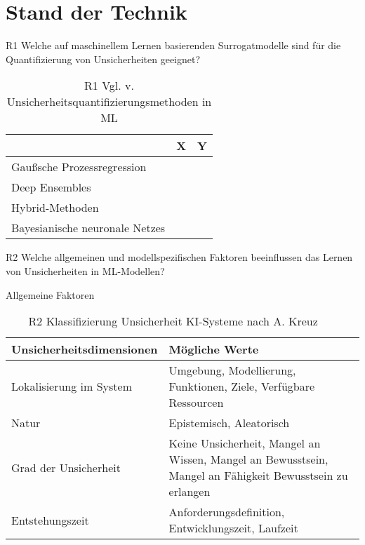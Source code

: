 
\chapter{Stand der Technik}
\label{chapter:stand-der-technik}


R1 Welche auf maschinellem Lernen basierenden Surrogatmodelle sind für die Quantifizierung von Unsicherheiten geeignet?

\begin{table}[htpb]
  \centering
  \begin{tabular}{|l|l|p{\dimexpr\textwidth-8cm-2\tabcolsep}|}  %
    \hline
    & \textbf{X} & \textbf{Y} \\
    \hline
    \gls{Gaußsche Prozessregression} & & \\
    \hline
    Deep Ensembles & & \\
    \hline
    Hybrid-Methoden & & \\
    \hline
    \gls{Bayesianische neuronale Netze}s & & \\
    \hline
  \end{tabular}
  \caption{R1 Vgl. v. Unsicherheitsquantifizierungsmethoden in ML}\label{tab:chapter6r1}
\end{table}


R2 Welche allgemeinen und modellspezifischen Faktoren beeinflussen das Lernen von Unsicherheiten in ML-Modellen?

Allgemeine Faktoren

\begin{table}[htpb]
  \begin{tabular}{|l|p{10cm}|}
    \hline
    \textbf{Unsicherheitsdimensionen} & \textbf{Mögliche Werte} \\
    \hline
    Lokalisierung im System & Umgebung, Modellierung, Funktionen, Ziele, Verfügbare Ressourcen \\
    \hline
    Natur & Epistemisch, Aleatorisch \\
    \hline
    Grad der Unsicherheit & Keine Unsicherheit, Mangel an Wissen, Mangel an Bewusstsein, Mangel an Fähigkeit Bewusstsein zu erlangen \\
    \hline
    Entstehungszeit & Anforderungsdefinition, Entwicklungszeit, Laufzeit \\
    \hline
  \end{tabular}
  \caption{R2 Klassifizierung Unsicherheit KI-Systeme nach A. Kreuz ~\nocite{AndreasKreutz2022} ~\nocite{AndreasKreutz2022b}}\label{tab:uqclass}
\end{table}

